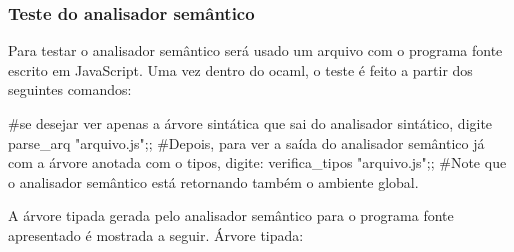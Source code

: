 \documentclass[12pt,a4paper,twoside]{article}
\begin{document}
\subsubsection{Teste do analisador semântico}
Para testar o analisador semântico será usado um arquivo com o programa fonte escrito em JavaScript.\newline
Uma vez dentro do ocaml, o teste é feito a partir dos seguintes comandos:
\begin{terminal}
#se desejar ver apenas a árvore sintática que sai do analisador sintático, digite
    parse_arq "arquivo.js";;
#Depois, para ver a saída do analisador semântico já com a árvore anotada com o tipos, digite:
    verifica_tipos "arquivo.js";;
#Note que o analisador semântico está retornando também o ambiente global.
\end{terminal}
A árvore tipada gerada pelo analisador semântico para o programa fonte apresentado é mostrada a seguir. \newline
Árvore tipada:
\end{document}
